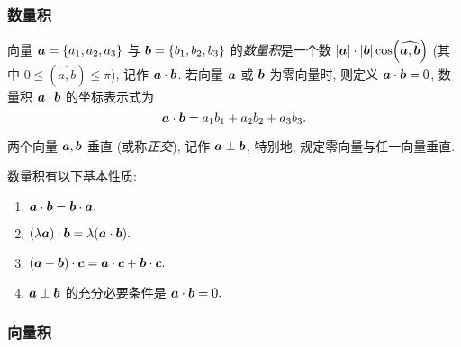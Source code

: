 \subsubsection{数量积}

\begin{definition}
    向量 $ \vb*{a}=\left\{a_{1}, a_{2}, a_{3}\right\} $ 与 $ \vb*{b}=\left\{b_{1}, b_{2}, b_{3}\right\} $ 的\textit{数量积}是一个数 $ |\vb*{a}| \cdot|\vb*{b}| \cos (\widehat{\vb*{a}, \vb*{b}}) $ (其中 $ 0 \leqslant(\widehat{a, b}) \leqslant \pi$), 
    记作 $ \vb*{a} \cdot \vb*{b} $. 若向量 $ \vb*{a} $ 或 $ \vb*{b} $ 为零向量时, 则定义 $ \vb*{a} \cdot \vb*{b}=0$, 数量积 $ \vb*{a} \cdot \vb*{b} $ 的坐标表示式为
    $$\vb*{a} \cdot \vb*{b}=a_{1} b_{1}+a_{2} b_{2}+a_{3} b_{3} .$$
\end{definition}

\begin{definition}[向量正交]
    两个向量 $ \vb*{a}, \vb*{b} $ 垂直 (或称\textit{正交}), 记作 $ \vb*{a} \perp \vb*{b} $, 特别地, 规定零向量与任一向量垂直.
\end{definition}

数量积有以下基本性质:
\begin{enumerate}[label=(\arabic{*})]
    \item $\vb*{a} \cdot \vb*{b}=\vb*{b} \cdot \vb*{a} .$
    \item  $(\lambda \vb*{a}) \cdot \vb*{b}=\lambda(\vb*{a} \cdot \vb*{b}) .$
    \item $(\vb*{a}+\vb*{b}) \cdot \vb*{c}=\vb*{a} \cdot \vb*{c}+\vb*{b} \cdot \vb*{c} .$
    \item $\vb*{a} \perp \vb*{b} $ 的充分必要条件是 $ \vb*{a} \cdot \vb*{b}=0 .$
\end{enumerate}

\subsubsection{向量积}

